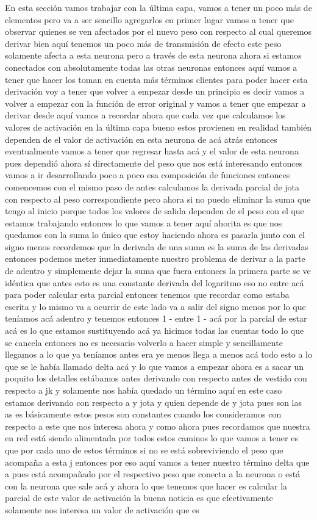 En esta sección vamos trabajar con la última capa, vamos a tener un poco más de elementos pero va a ser sencillo agregarlos en primer lugar vamos a tener que observar quienes se ven afectados por el nuevo peso con respecto al cual queremos derivar bien aquí tenemos un poco más de transmisión de efecto este peso solamente afecta a esta neurona pero a través de esta neurona ahora si estamos conectados con absolutamente todas las otras neuronas entonces aquí vamos a tener que hacer los toman en cuenta más términos clientes para poder hacer esta derivación voy a tener que volver a empezar desde un principio es decir vamos a volver a empezar con la función de error original y vamos a tener que empezar a derivar desde aquí vamos a recordar ahora que cada vez que calculamos los valores de activación en la última capa bueno estos provienen en realidad también dependen de el valor de activación en esta neurona de acá atrás entonces eventualmente vamos a tener que regresar hasta acá y el valor de esta neurona pues dependió ahora sí directamente del peso que nos está interesando entonces vamos a ir desarrollando poco a poco esa composición de funciones entonces comencemos con el mismo paso de antes calculamos la derivada parcial de jota con respecto al peso correspondiente pero ahora si no puedo eliminar la suma que tengo al inicio porque todos los valores de salida dependen de el peso con el que estamos trabajando entonces lo que vamos a tener aquí ahorita es que nos quedamos con la suma lo único que estoy haciendo ahora es pasarla junto con el signo menos recordemos que la derivada de una suma es la suma de las derivadas entonces podemos meter inmediatamente nuestro problema de derivar a la parte de adentro y simplemente dejar la suma que fuera entonces la primera parte se ve idéntica que antes esto es una constante derivada del logaritmo eso no entre acá para poder calcular esta parcial entonces tenemos que recordar como estaba escrita y lo mismo va a ocurrir de este lado va a salir del signo menos por lo que teníamos acá adentro y tenemos entonces 1 - entre 1 - acá por la parcial de estar acá es lo que estamos sustituyendo acá ya hicimos todas las cuentas todo lo que se cancela entonces no es necesario volverlo a hacer simple y sencillamente llegamos a lo que ya teníamos antes era ye menos llega a menos acá todo esto a lo que se le había llamado delta acá y lo que vamos a empezar ahora es a sacar un poquito los detalles estábamos antes derivando con respecto antes de vestido con respecto a jk y solamente nos había quedado un término aquí en este caso estamos derivando con respecto a y jota y quien depende de y jota pues son las as es básicamente estos pesos son constantes cuando los consideramos con respecto a este que nos interesa ahora y como ahora pues recordamos que nuestra en red está siendo alimentada por todos estos caminos lo que vamos a tener es que por cada uno de estos términos si no se está sobreviviendo el peso que acompaña a esta j entonces por eso aquí vamos a tener nuestro término delta que a pues está acompañado por el respectivo peso que conecta a la neurona o está con la neurona que sale acá y ahora lo que tenemos que hacer es calcular la parcial de este valor de activación la buena noticia es que efectivamente solamente nos interesa un valor de activación que es 